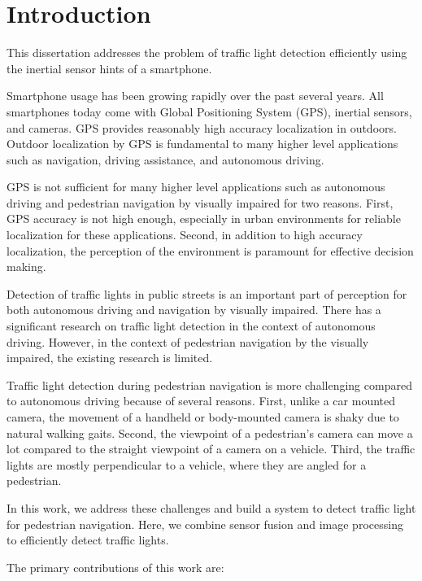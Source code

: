 \chapter{Introduction}

This dissertation addresses the problem of traffic light detection efficiently using the inertial sensor hints of a smartphone.

Smartphone usage has been growing rapidly over the past several years. 
All smartphones today come with Global Positioning System (GPS), inertial sensors, and cameras. 
GPS provides reasonably high accuracy localization in outdoors. 
Outdoor localization by GPS is fundamental to many higher level applications such as navigation, driving assistance, and autonomous driving.

GPS is not sufficient for many higher level applications such as autonomous driving and pedestrian navigation by visually impaired for two reasons.
First, GPS accuracy is not high enough, especially in urban environments for reliable localization for these applications. 
Second, in addition to high accuracy localization, the perception of the environment is paramount for effective decision making. 

Detection of traffic lights in public streets is an important part of perception for both autonomous driving and navigation by visually impaired.  
There has a significant research  on traffic light detection in the context of autonomous driving. 
However, in the context of pedestrian navigation by the visually impaired, the existing research is limited. 

Traffic light detection during pedestrian navigation is more challenging compared to autonomous driving because of several reasons. 
First, unlike a car mounted camera, the movement of a handheld or body-mounted camera is shaky due to natural walking gaits. 
Second, the viewpoint of a pedestrian's camera can move a lot compared to the straight viewpoint of a camera on a vehicle.
Third, the traffic lights are mostly perpendicular to a vehicle, where they are angled for a pedestrian. 

In this work, we address these challenges and build a system to detect traffic light for pedestrian navigation.
Here, we combine sensor fusion and image processing to efficiently detect traffic lights. 

The primary contributions of this work are:

